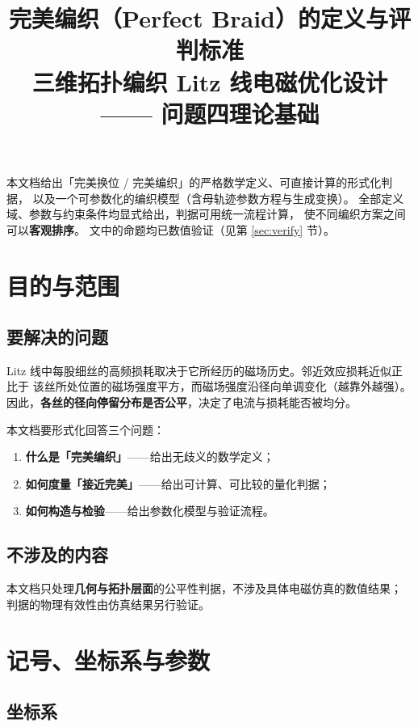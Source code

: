 \documentclass[12pt, a4paper]{ctexart}
\title{\bfseries 完美编织（Perfect Braid）的定义与评判标准\\[6pt]
\large 三维拓扑编织 Litz 线电磁优化设计 —— 问题四理论基础}
\author{}
\date{}
\begin{document}
\maketitle
\thispagestyle{empty}

\begin{keybox}[文档定位]
本文档给出「完美换位 / 完美编织」的严格数学定义、可直接计算的形式化判据，
以及一个可参数化的编织模型（含母轨迹参数方程与生成变换）。
全部定义域、参数与约束条件均显式给出，判据可用统一流程计算，
使不同编织方案之间可以\textbf{客观排序}。
文中的命题均已数值验证（见第 \ref{sec:verify} 节）。
\end{keybox}

\section{目的与范围}

\subsection{要解决的问题}

Litz 线中每股细丝的高频损耗取决于它所经历的磁场历史。邻近效应损耗近似正比于
该丝所处位置的磁场强度平方，而磁场强度沿径向单调变化（越靠外越强）。
因此，\textbf{各丝的径向停留分布是否公平}，决定了电流与损耗能否被均分。

本文档要形式化回答三个问题：

\begin{enumerate}[label=(\roman*), leftmargin=2.4em, itemsep=2pt]
\item \textbf{什么是「完美编织」}——给出无歧义的数学定义；
\item \textbf{如何度量「接近完美」}——给出可计算、可比较的量化判据；
\item \textbf{如何构造与检验}——给出参数化模型与验证流程。
\end{enumerate}

\subsection{不涉及的内容}

本文档只处理\textbf{几何与拓扑层面}的公平性判据，不涉及具体电磁仿真的数值结果；
判据的物理有效性由仿真结果另行验证。

\section{记号、坐标系与参数}

\subsection{坐标系}
\end{document}
